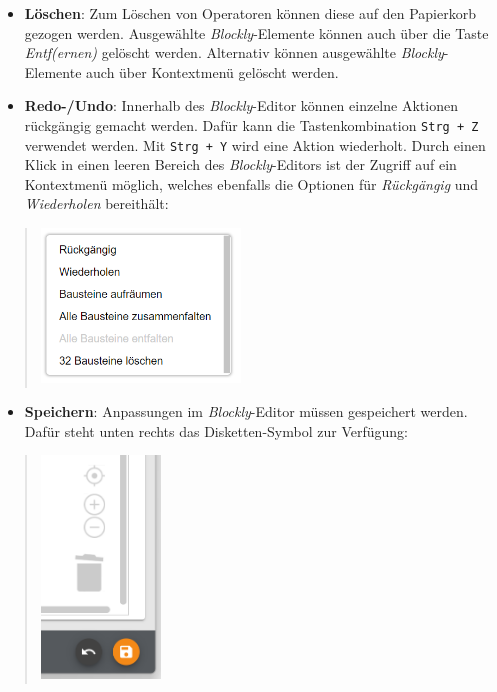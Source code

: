 \documentclass[
  letterpaper,
  DIV=11]{scrreprt}
\providecommand{\tightlist}{%
  \setlength{\itemsep}{0pt}\setlength{\parskip}{0pt}}\usepackage{longtable,booktabs,array}
\begin{document}
\begin{tcolorbox}
\begin{itemize}
\item
  \textbf{Löschen}: Zum Löschen von Operatoren können diese auf den
  Papierkorb gezogen werden. Ausgewählte \emph{Blockly}-Elemente können
  auch über die Taste \emph{Entf(ernen)} gelöscht werden. Alternativ
  können ausgewählte \emph{Blockly}-Elemente auch über Kontextmenü
  gelöscht werden.
\item
  \textbf{Redo-/Undo}: Innerhalb des \emph{Blockly}-Editor können
  einzelne Aktionen rückgängig gemacht werden. Dafür kann die
  Tastenkombination \texttt{Strg\ +\ Z} verwendet werden. Mit
  \texttt{Strg\ +\ Y} wird eine Aktion wiederholt. Durch einen Klick in
  einen leeren Bereich des \emph{Blockly}-Editors ist der Zugriff auf
  ein Kontextmenü möglich, welches ebenfalls die Optionen für
  \emph{Rückgängig} und \emph{Wiederholen} bereithält:
\end{itemize}

\begin{quote}
\includegraphics[width=2.08333in,height=\textheight]{img/screenshot-context-menu-blockly-editor-example01-DEU.png}
\end{quote}

\begin{itemize}
\tightlist
\item
  \textbf{Speichern}: Anpassungen im \emph{Blockly}-Editor müssen
  gespeichert werden. Dafür steht unten rechts das Disketten-Symbol zur
  Verfügung:
\end{itemize}

\begin{quote}
\includegraphics[width=1.25in,height=\textheight]{img/screenshot-blockly-save-icon-example01.png}
\end{quote}


\end{tcolorbox}
\end{document}
